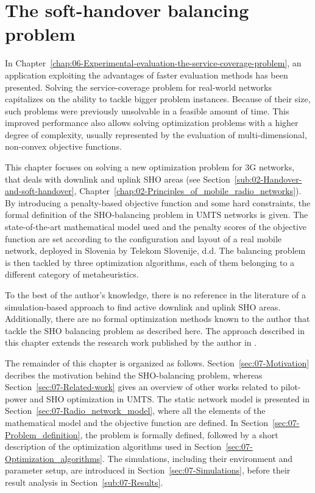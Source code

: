 
\chapter{The soft-handover balancing problem \label{chap:07-Experimental-evaluation-the-SHO-alignment-problem}}


\noindent In Chapter~\ref{chap:06-Experimental-evaluation-the-service-coverage-problem},
an application exploiting the advantages of faster evaluation methods
has been presented. Solving the service-coverage problem for real-world
networks capitalizes on the ability to tackle bigger problem instances.
Because of their size, such problems were previously unsolvable in
a feasible amount of time. This improved performance also allows solving
optimization problems with a higher degree of complexity, usually
represented by the evaluation of multi-dimensional, non-convex objective
functions.

\noindent This chapter focuses on solving a new optimization problem
for 3G networks, that deals with downlink and uplink SHO areas (see
Section~\ref{sub:02-Handover-and-soft-handover}, Chapter~\ref{chap:02-Principles_of_mobile_radio_networks}).
By introducing a penalty-based objective function and some hard constraints,
the formal definition of the SHO-balancing problem in UMTS networks
is given. The state-of-the-art mathematical model used and the penalty
scores of the objective function are set according to the configuration
and layout of a real mobile network, deployed in Slovenia by Telekom
Slovenije, d.d. The balancing problem is then tackled by three optimization
algorithms, each of them belonging to a different category of metaheuristics.

To the best of the author's knowledge, there is no reference in the
literature of a simulation-based approach to find active downlink
and uplink SHO areas. Additionally, there are no formal optimization
methods known to the author that tackle the SHO balancing problem
as described here. The approach described in this chapter extends
the research work published by the author in \cite{Benedicic_Balancing_downlink_uplink_soft_handover_areas_in_UMTS_networks:2012}.

The remainder of this chapter is organized as follows. Section~\ref{sec:07-Motivation}
decribes the motivation behind the SHO-balancing problem, whereas
Section~\ref{sec:07-Related-work} gives an overview of other works
related to pilot-power and SHO optimization in UMTS. The static network
model is presented in Section~\ref{sec:07-Radio_network_model},
where all the elements of the mathematical model and the objective
function are defined. In Section~\ref{sec:07-Problem_definition},
the problem is formally defined, followed by a short description of
the optimization algorithms used in Section~\ref{sec:07-Optimization_algorithms}.
The simulations, including their environment and parameter setup,
are introduced in Section~\ref{sec:07-Simulations}, before their
result analysis in Section~\ref{sub:07-Results}.


